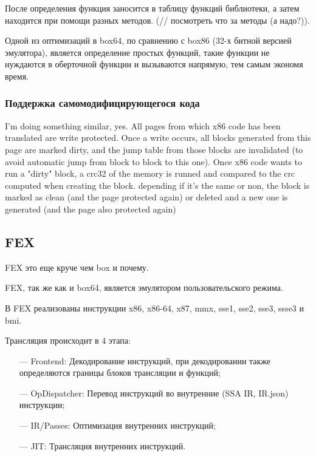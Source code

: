 После определения функция заносится в таблицу функций библиотеки, а затем находится при помощи разных методов. (// посмотреть что за методы (а надо?)).

Одной из оптимизаций в box64, по сравнению с box86 (32-х битной версией эмулятора), является определение простых функций, такие функции не нуждаются в оберточной функции и вызываются напрямую, тем самым экономя время.  \cite{box64_deep}

\subsubsection{Поддержка самомодифицирующегося кода}

I'm doing something similar, yes. All pages from which x86 code has been translated are write protected. Once a write occurs, all blocks generated from this page are marked dirty, and the jump table from those blocks are invalidated (to avoid automatic jump from block to block to this one). Once x86 code wants to run a "dirty" block, a crc32 of the memory is runned and compared to the crc computed when creating the block. depending if it's the same or non, the block is marked as clean (and the page protected again) or deleted and a new one is generated (and the page also protected again)

\subsection{FEX}

FEX это еще круче чем box и почему.

FEX, так же как и box64, является эмулятором пользовательского режима.

В FEX реализованы инструкции x86, x86-64, x87, mmx, sse1, sse2, sse3, ssse3 и bmi.

Трансляция происходит в 4 этапа:

\begin{itemize}[leftmargin=1.6\parindent]
	\item[---] Frontend: Декодирование инструкций, при декодировании также определяются границы блоков трансляции и функций;
	\item[---] OpDispatcher: Перевод инструкций во внутренние (SSA IR, IR.json) инструкции;
	\item[---] IR/Passes: Оптимизация внутренних инструкций;
	\item[---] JIT: Трансляция внутренних инструкций.
\end{itemize}

